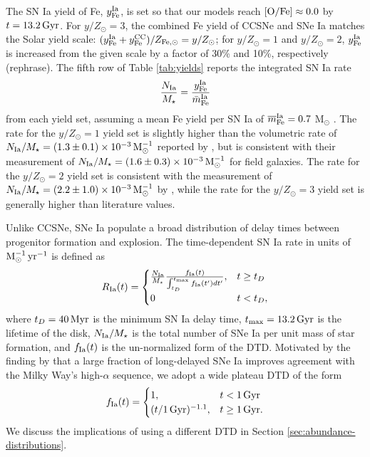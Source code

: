 \documentclass[twocolumn,twocolappendix,linenumbers]{aastex631}
\newcommand{\todo}[1]{{\color{red}#1}}
\newcommand{\mathOFe}{{\rm [O/Fe]}}
\newcommand{\yZ}[1]{$y/Z_\odot=#1$}
\begin{document}
The SN Ia yield of Fe, $y_{\rm Fe}^{\rm Ia}$, is set so that our models reach $\mathOFe\approx0.0$ by $t=13.2\,{\rm Gyr}$. For \yZ{3}, the combined Fe yield of CCSNe and SNe Ia matches the Solar yield scale: $(y_{\rm Fe}^{\rm Ia}+y_{\rm Fe}^{\rm CC})/Z_{\rm Fe,\odot}=y/Z_\odot$; for \yZ{1} and \yZ{2}, $y_{\rm Fe}^{\rm Ia}$ is increased from the given scale by a factor of 30\% and 10\%, respectively \todo{(rephrase)}. The fifth row of Table \ref{tab:yields} reports the integrated SN Ia rate 
\begin{equation}
    \frac{N_{\rm Ia}}{M_\star} = \frac{y_{\rm Fe}^{\rm Ia}}{\bar m_{\rm Fe}^{\rm Ia}}
    \label{eq:snia-rate}
\end{equation}
from each yield set, assuming a mean Fe yield per SN Ia of $\overline m_{\rm Fe}^{\rm Ia}=0.7$ M$_\odot$ \citep{mazzali_common_2007,howell_effect_2009}. The rate for the \yZ{1} yield set is slightly higher than the volumetric rate of $N_{\rm Ia}/M_\star=(1.3\pm0.1)\times10^{-3}\,{\rm M}_\odot^{-1}$ reported by \citet{maoz_star_2017}, but is consistent with their measurement of $N_{\rm Ia}/M_\star=(1.6\pm0.3)\times10^{-3}\,{\rm M}_\odot^{-1}$ for field galaxies. The rate for the \yZ{2} yield set is consistent with the measurement of $N_{\rm Ia}/M_\star=(2.2\pm1.0)\times10^{-3}\,{\rm M}_\odot^{-1}$ by \citet{maoz_type-ia_2012}, while the rate for the \yZ{3} yield set is generally higher than literature values.

Unlike CCSNe, SNe Ia populate a broad distribution of delay times between progenitor formation and explosion. The time-dependent SN Ia rate in units of ${\rm M}_\odot^{-1}\,{\rm yr}^{-1}$ is defined as
\begin{equation}
    R_{\rm Ia}(t) = 
    \begin{cases}
        \frac{N_{\rm Ia}}{M_\star}
        \frac{f_{\rm Ia}(t)}{\int_{t_D}^{t_{\rm max}} f_{\rm Ia}(t') dt'}, & t \ge t_D \\
        0 & t < t_D,
    \end{cases}
    \label{eq:dtd-function}
\end{equation}
where $t_D=40\,{\rm Myr}$ is the minimum SN Ia delay time, $t_{\rm max}=13.2\,{\rm Gyr}$ is the lifetime of the disk, $N_{\rm Ia}/M_\star$ is the total number of SNe Ia per unit mass of star formation, and $f_{\rm Ia}(t)$ is the un-normalized form of the DTD. Motivated by the finding by \citet{dubay_galactic_2024} that a large fraction of long-delayed SNe Ia improves agreement with the Milky Way's high-$\alpha$ sequence, we adopt a wide plateau DTD of the form
\begin{equation}
    \label{eq:plateau-dtd}
    f_{\rm Ia}(t) =
    \begin{cases}
        1, & t < 1\,{\rm Gyr} \\
        (t/1\,{\rm Gyr})^{-1.1}, & t \ge 1\,{\rm Gyr}.
    \end{cases}
\end{equation}
We discuss the implications of using a different DTD in Section \ref{sec:abundance-distributions}.
\end{document}

